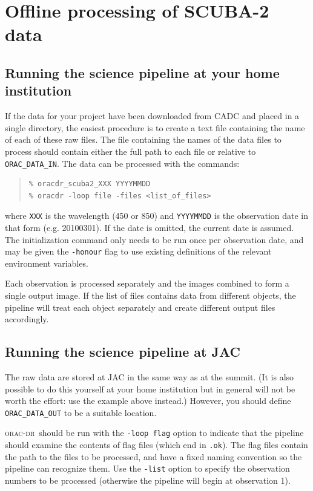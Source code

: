 \documentclass[twoside,11pt]{article}
\newcommand{\xlabel}[1]{}
\renewcommand{\_}{\texttt{\symbol{95}}}
\newenvironment{myquote}{\begin{quote}\begin{small}}{\end{small}\end{quote}}
\newcommand{\oracdr}{\textsc{orac-dr}}
\begin{document}
\section{\xlabel{offline}Offline processing of SCUBA-2 data\label{se:offline}}

\subsection{Running the science pipeline at your home institution}

If the data for your project have been downloaded from CADC and placed
in a single directory, the easiest procedure is to create a text file
containing the name of each of these raw files. The file containing
the names of the data files to process should contain either the full
path to each file or relative to \verb+ORAC_DATA_IN+. The data can be
processed with the commands:
\begin{myquote}
\begin{verbatim}
% oracdr_scuba2_XXX YYYYMMDD
% oracdr -loop file -files <list_of_files>
\end{verbatim}
\end{myquote}
where \verb+XXX+ is the wavelength (450 or 850) and \verb+YYYYMMDD+ is
the observation date in that form (e.g. 20100301). If the date is
omitted, the current date is assumed. The initialization command only
needs to be run once per observation date, and may be given the
\verb+-honour+ flag to use existing definitions of the relevant
environment variables.

Each observation is processed separately and the images combined to
form a single output image. If the list of files contains data from
different objects, the pipeline will treat each object separately and
create different output files accordingly.

\subsection{Running the science pipeline at JAC}

The raw data are stored at JAC in the same way as at the summit. (It
is also possible to do this yourself at your home institution but in
general will not be worth the effort: use the example above instead.)
However, you should define \verb+ORAC_DATA_OUT+ to be a suitable
location.

\oracdr\ should be run with the \texttt{-loop flag} option to indicate
that the pipeline should examine the contents of flag files (which end
in \verb+.ok+). The flag files contain the path to the files to be
processed, and have a fixed naming convention so the pipeline can
recognize them. Use the \texttt{-list} option to specify the
observation numbers to be processed (otherwise the pipeline will begin
at observation 1).
\end{document}
